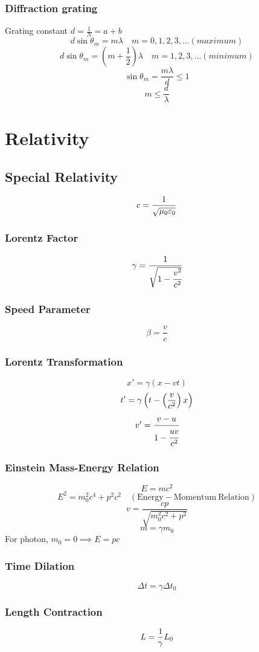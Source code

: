 \documentclass{article}
\begin{document}
\subsubsection*{Diffraction grating}
Grating constant \(d=\frac{1}{N}=a+b\)
\[d\sin\theta_m=m\lambda\quad m=0,1,2,3,...(maximum)\]\[d\sin\theta_m=(m+\frac{1}{2})\lambda\quad m=1,2,3,...(minimum)\]
\[\sin\theta_m=\frac{m\lambda}{d}\le1\]\[m\le\frac{d}{\lambda}\]

\section{Relativity}
\subsection*{Special Relativity}
\[c={1 \over \sqrt{\mu_0\varepsilon_0}}\]

\subsubsection*{Lorentz Factor}
\[\gamma = \cfrac{1}{\sqrt{1-\cfrac{v^2}{c^2}}}\]

\subsubsection*{Speed Parameter}
\[\beta = \frac{v}{c}\]

\subsubsection*{Lorentz Transformation}
\[x'=\gamma(x-vt)\]
\[t'=\gamma \left(t-\left(v \over c^2\right)x\right)\]
\[v'=\cfrac{v-u}{1-\cfrac{uv}{c^2}}\]

\subsubsection*{Einstein Mass-Energy Relation}
\[E=mc^2\]
\[E^2=m_0^2c^4+p^2c^2\quad(\mathrm{Energy-Momentum\ Relation})\]
\[v=\frac{cp}{\sqrt{m_0^2c^2+p^2}}\]
\[m=\gamma m_0\]
For photon, \(m_0=0\implies E=pc\)
\subsubsection*{Time Dilation}
\[\Delta t=\gamma \Delta t_0\]

\subsubsection*{Length Contraction}
\[L={1 \over \gamma}L_0\]
\end{document}
